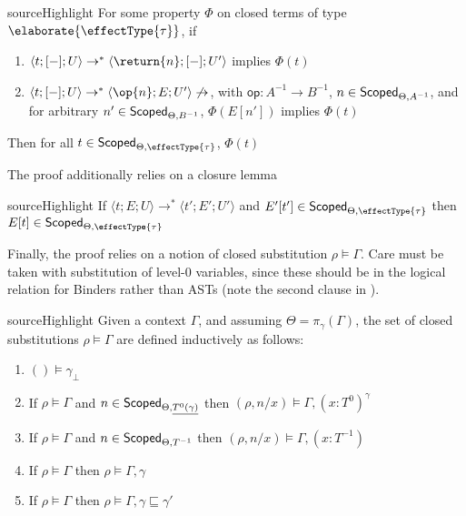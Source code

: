 \begin{definition}{sourceHighlight}
  For some property $\Phi$ on closed terms of type $\elaborate{\effectType{\tau}}$, if
  \begin{enumerate}
    \item $\langle t; [-]; U \rangle \to^{*} \langle \return{n};[-];U' \rangle$ implies $\Phi(t)$
    \item $\langle t; [-]; U \rangle \to^{*} \langle \op{n};E;U' \rangle \not\to$, with $\textsf{op}: A^{-1} \to B^{-1}$, $n \in \textsf{Scoped}_{{\Theta}, {A^{-1}}}$, and for arbitrary $n' \in \textsf{Scoped}_{{\Theta}, {B^{-1}}}$, $\Phi(E[n'])$ implies $\Phi(t)$
  \end{enumerate}
  Then for all $t \in \scoped{\effectType{\tau}}$, $\Phi(t)$
\end{definition}

The proof additionally relies on a closure lemma \citep{kuchta-2023}

\begin{lemma}{sourceHighlight}\label{lemma:closure-reduction}
  If $\langle t;E;U \rangle \to^{*} \langle t';E';U' \rangle$ and $E'[t'] \in \scoped{\effectType{\tau}}$ then $E[t] \in \scoped{\effectType{\tau}}$
\end{lemma}

Finally, the proof relies on a notion of closed substitution $\rho \vDash \Gamma$. Care must be taken with substitution of level-$0$ variables, since these should be in the logical relation for \textsf{Binder}s rather than \textsf{AST}s (note the second clause in ).

\begin{definition}{sourceHighlight}\label{dfn:closed-substitution}
  Given a context $\Gamma$, and assuming $\Theta = \pi_{\gamma}(\Gamma)$, the set of closed substitutions $\rho \vDash \Gamma$ are defined inductively as follows:
  \begin{enumerate}
    \item $() \vDash \gamma_{\bot}$
    \item If $\rho \vDash \Gamma$ and $n \in \textsf{Scoped}_{{\Theta}, {\underline{T^{0} (\gamma)}}}$ then $(\rho, n/x) \vDash \Gamma, (x:T^0)^{\gamma}$ 
    \item If $\rho \vDash \Gamma$ and $n \in \textsf{Scoped}_{{\Theta}, {T^{-1}}}$ then $(\rho, n/x) \vDash \Gamma, (x:T^{-1})$
    \item If $\rho \vDash \Gamma$ then $\rho \vDash \Gamma, \gamma$
    \item If $\rho \vDash \Gamma$ then $\rho \vDash \Gamma, \gamma \sqsubseteq \gamma'$
  \end{enumerate}
\end{definition}

